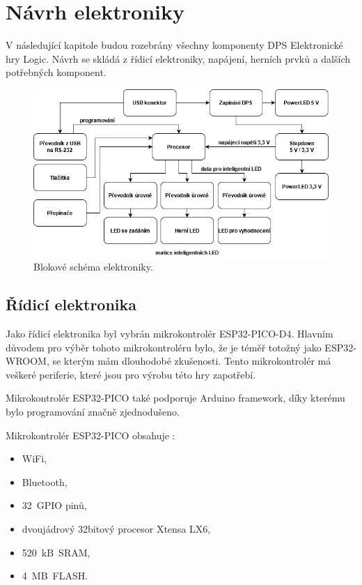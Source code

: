 \chapter{Návrh elektroniky}
V následující kapitole budou rozebrány všechny komponenty DPS Elektronické hry Logic. Návrh se skládá z řídicí elektroniky, 
napájení, herních prvků a dalších potřebných komponent.

\begin{figure}[!h]
  \begin{center}
    \includegraphics[scale=0.5]{obrazky/v2_blokove_schema.jpg}
  \end{center}
  \caption[Blokové schéma elektroniky]{Blokové schéma elektroniky.}
\end{figure}    

\section{Řídicí elektronika}
Jako řídicí elektronika byl vybrán mikrokontrolér ESP32-PICO-D4. Hlavním důvodem pro výběr tohoto mikrokontroléru bylo, že je téměř totožný 
jako ESP32-WROOM, se 
kterým mám dlouhodobé zkušenosti. Tento mikrokontrolér má veškeré periferie, které jsou pro výrobu této hry zapotřebí. 

Mikrokontrolér ESP32-PICO také podporuje Arduino framework, díky kterému bylo programování značně zjednodušeno.

Mikrokontrolér ESP32-PICO obsahuje \cite{PICO_datasheet}: 
\begin{itemize}
    \item WiFi,
    \item Bluetooth, 
    \item 32~GPIO pinů, 
    \item dvoujádrový 32bitový procesor Xtensa LX6,
    \item 520~kB~SRAM, 
    \item 4~MB~FLASH. 
  \end{itemize}

